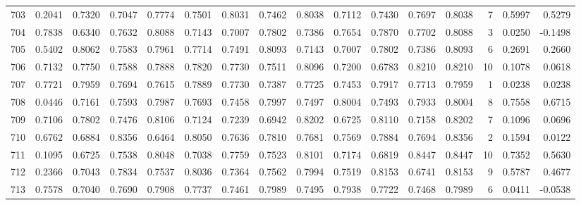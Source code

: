 \begin{tabular}{lrrrrrrrrrrrrrrr}
703 &      0.2041 &  0.7320 &  0.7047 &  0.7774 &  0.7501 &  0.8031 &  0.7462 &  0.8038 &  0.7112 &  0.7430 &   0.7697 &     0.8038 &      7 &                    0.5997 &                     0.5279 \\
704 &      0.7838 &  0.6340 &  0.7632 &  0.8088 &  0.7143 &  0.7007 &  0.7802 &  0.7386 &  0.7654 &  0.7870 &   0.7702 &     0.8088 &      3 &                    0.0250 &                    -0.1498 \\
705 &      0.5402 &  0.8062 &  0.7583 &  0.7961 &  0.7714 &  0.7491 &  0.8093 &  0.7143 &  0.7007 &  0.7802 &   0.7386 &     0.8093 &      6 &                    0.2691 &                     0.2660 \\
706 &      0.7132 &  0.7750 &  0.7588 &  0.7888 &  0.7820 &  0.7730 &  0.7511 &  0.8096 &  0.7200 &  0.6783 &   0.8210 &     0.8210 &     10 &                    0.1078 &                     0.0618 \\
707 &      0.7721 &  0.7959 &  0.7694 &  0.7615 &  0.7889 &  0.7730 &  0.7387 &  0.7725 &  0.7453 &  0.7917 &   0.7713 &     0.7959 &      1 &                    0.0238 &                     0.0238 \\
708 &      0.0446 &  0.7161 &  0.7593 &  0.7987 &  0.7693 &  0.7458 &  0.7997 &  0.7497 &  0.8004 &  0.7493 &   0.7933 &     0.8004 &      8 &                    0.7558 &                     0.6715 \\
709 &      0.7106 &  0.7802 &  0.7476 &  0.8106 &  0.7124 &  0.7239 &  0.6942 &  0.8202 &  0.6725 &  0.8110 &   0.7158 &     0.8202 &      7 &                    0.1096 &                     0.0696 \\
710 &      0.6762 &  0.6884 &  0.8356 &  0.6464 &  0.8050 &  0.7636 &  0.7810 &  0.7681 &  0.7569 &  0.7884 &   0.7694 &     0.8356 &      2 &                    0.1594 &                     0.0122 \\
711 &      0.1095 &  0.6725 &  0.7538 &  0.8048 &  0.7038 &  0.7759 &  0.7523 &  0.8101 &  0.7174 &  0.6819 &   0.8447 &     0.8447 &     10 &                    0.7352 &                     0.5630 \\
712 &      0.2366 &  0.7043 &  0.7834 &  0.7537 &  0.8036 &  0.7364 &  0.7562 &  0.7994 &  0.7519 &  0.8153 &   0.6741 &     0.8153 &      9 &                    0.5787 &                     0.4677 \\
713 &      0.7578 &  0.7040 &  0.7690 &  0.7908 &  0.7737 &  0.7461 &  0.7989 &  0.7495 &  0.7938 &  0.7722 &   0.7468 &     0.7989 &      6 &                    0.0411 &                    -0.0538 \\

\end{tabular}

